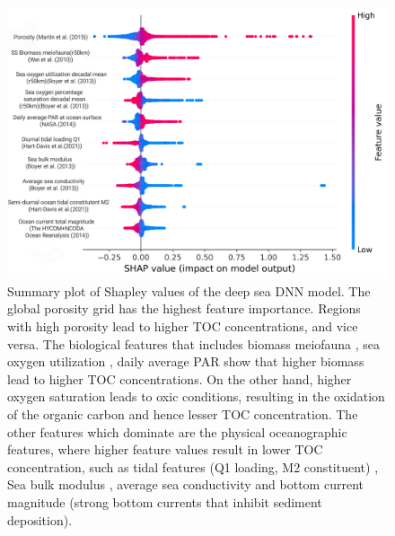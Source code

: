 \documentclass[journal abbreviation, manuscript]{copernicus}
\begin{document}
\begin{figure}[!htb]
\includegraphics[width=12cm]{figures/f08.png}
\caption{Summary plot of Shapley values of the deep sea DNN model. The global porosity grid \citep{Martin2005Porosity} has the highest feature importance. Regions with high porosity lead to higher TOC concentrations, and vice versa. The biological features that includes biomass meiofauna \citep{WEI2010}, sea oxygen utilization \citep{WOA13X2013}, daily average PAR \citep{nasaaqua} show that higher biomass lead to higher TOC concentrations. On the other hand, higher oxygen saturation leads to oxic conditions, resulting in the oxidation of the organic carbon and hence lesser TOC concentration. The other features which dominate are the physical oceanographic features, where higher feature values result in lower TOC concentration, such as tidal features (Q1 loading, M2 constituent) \citep{HartDavis2021EOT20}, Sea bulk modulus \citep{WOA13X2013}, average sea conductivity \citep{WOA13X2013} and bottom current magnitude \citep{HYCOM2014} (strong bottom currents that inhibit sediment deposition).}
\label{fig:shap_do}
\end{figure}
\clearpagey
\end{document}
